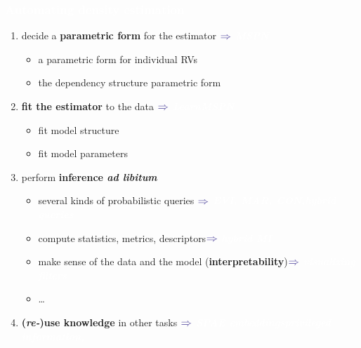 \documentclass[xcolor={usenames,dvipsnames,svgnames}, compress]{beamer}
\newcommand{\highlighttext}[2][yellow]{{\colorbox{#1}{\textcolor{white}{#2}}}}
\begin{document}
\begin{frame}[t]
  \frametitle{\highlighttext[bgrey2]{Automating density estimation}}
  \footnotesize
  
  \begin{enumerate}
    \setlength{\itemindent}{0pt}
  \item decide a \textbf{parametric form} for the estimator \hfill$\color{violet}\boldsymbol\Rightarrow$
  {\scriptsize\highlighttext[bgrey2]{\emph{\textbf{MSPN}}}} 
    \begin{itemize}
      \setlength{\itemindent}{-10pt}
      \scriptsize
    \item  a parametric form for individual RVs 
\item the dependency structure parametric form
    \end{itemize}
  \item \textbf{fit the estimator} to the data  \hfill$\color{violet}\boldsymbol\Rightarrow$
  {\scriptsize\highlighttext[bgrey2]{\emph{\textbf{LearnMSPN}}}} 
    \begin{itemize}
      \setlength{\itemindent}{-10pt}
      \scriptsize
    \item fit model structure
      \item fit model parameters
    \end{itemize}
  \item perform \textbf{inference \emph{ad libitum}}
    \begin{itemize}\scriptsize
      \setlength{\itemindent}{-10pt}
    \item several kinds of probabilistic queries \hfill$\color{violet}\boldsymbol\Rightarrow$
  {\scriptsize\highlighttext[tomato4]{\emph{\textbf{EVI, MAR,
          CON,}}}}{\scriptsize\highlighttext[bgrey2]{\emph{\textbf{hybrid
        queries}}}}  
    \item compute statistics, metrics, descriptors\hfill$\color{violet}\boldsymbol\Rightarrow$
  {\scriptsize\highlighttext[bgrey2]{\emph{\textbf{hybrid MI}}}}
      \item make sense of the data and the model (\textbf{interpretability})\hfill$\color{violet}\boldsymbol\Rightarrow$
  {\scriptsize\highlighttext[tomato4]{\emph{\textbf{visualizing
          filters}}}} 
      \item\dots
    \end{itemize}
  

    \item \textbf{(\emph{re-})use knowledge} in other tasks \hfill$\color{violet}\boldsymbol\Rightarrow$
  {\scriptsize\highlighttext[tomato4]{\emph{\textbf{SPAE
          embeddings}}}}{\scriptsize\highlighttext[bgrey2]{\emph{\textbf{privileged
        information,}}}}  
  \end{enumerate}
\end{frame}
\end{document}
